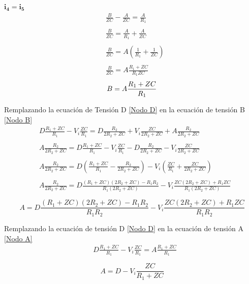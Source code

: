 \begin{itemize}
                $ \mathbf{i_{4}=i_{5}}$
                \begin{align*}
                    &\frac{B}{ZC} - \frac{A}{ZC} = \frac{A}{R_{1}}\\\\
                    &\frac{B}{ZC} = \frac{A}{R_{1}} + \frac{A}{ZC}\\\\
                    &\frac{B}{ZC} = A(\frac{1}{R_{1}} + \frac{1}{ZC})\\\\
                    &\frac{B}{ZC} = A\frac{R_{1}+ZC}{R_{1}ZC}
                \end{align*}
                \begin{equation}\label{Nodo A}
                    B= A\frac{R_{1}+ZC}{R_{1}} \\\\
                \end{equation}
        \end{itemize}
    
        Remplazando la ecuación de Tensión D \ref{Nodo D} en la ecuación de tensión B \ref{Nodo B}
        \begin{align*}
            &D\frac{R_{1}+ZC}{R_{1}} - V_{i}\frac{ZC}{R_{1}} = D\frac{R_{2}}{2R_{2}+ZC}  + V_{i}\frac{ZC}{2R_{2}+ZC} + A\frac{R_{2}}{2R_{2}+ZC} \\\\
            &A\frac{R_{2}}{2R_{2}+ZC} = D\frac{R_{1}+ZC}{R_{1}} - V_{i}\frac{ZC}{R_{1}} - D\frac{R_{2}}{2R_{2}+ZC} - V_{i}\frac{ZC}{2R_{2}+ZC}  \\\\
            &A\frac{R_{2}}{2R_{2}+ZC} = D(\frac{R_{1}+ZC}{R_{1}} - \frac{R_{2}}{2R_{2}+ZC}) - V_{i}(\frac{ZC}{R_{1}}  + \frac{ZC}{2R_{2}+ZC}) \\\\
            &A\frac{R_{2}}{2R_{2}+ZC} = D\frac{(R_{1}+ZC)(2R_{2}+ZC)-R_{1}R_{2}}{R_{1}(2R_{2}+ZC)} - V_{i}\frac{ZC(2R_{2}+ZC)+ R_{1}ZC}{R_{1}(2R_{2}+ZC)} \\\\
        \end{align*}
        \begin{equation}\label{Nodo D en B}
            A = D\frac{ (R_{1}+ZC)(2R_{2}+ZC)-R_{1}R_{2} }{ R_{1}R_{2}} - V_{i}\frac{ ZC(2R_{2}+ZC)+ R_{1}ZC }{ R_{1}R_{2}}
        \end{equation}
    
        Remplazando la ecuación de tensión D \ref{Nodo D} en la ecuación de tensión A \ref{Nodo A}
        \begin{align*}
            &D\frac{R_{1}+ZC}{R_{1}} - V_{i}\frac{ZC}{R_{1}} = A\frac{R_{1}+ZC}{R_{1}} \\\\
        \end{align*}
        \begin{equation}\label{Nodo D en A}
            A = D - V_{i}\frac{ZC}{R_{1}+ZC}
        \end{equation}
    
